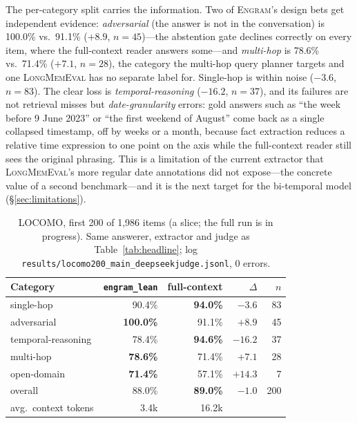 \documentclass{article}
\newcommand{\engram}{\textsc{Engram}}
\newcommand{\lean}{\texttt{engram\_lean}}
\begin{document}
The per-category split carries the information. Two of \engram{}'s design bets get independent evidence:
\emph{adversarial} (the answer is not in the conversation) is 100.0\% vs.\ 91.1\% ($+8.9$, $n=45$)---the
abstention gate declines correctly on every item, where the full-context reader answers some---and
\emph{multi-hop} is 78.6\% vs.\ 71.4\% ($+7.1$, $n=28$), the category the multi-hop query planner targets
and one \textsc{LongMemEval} has no separate label for. Single-hop is within noise ($-3.6$, $n=83$). The
clear loss is \emph{temporal-reasoning} ($-16.2$, $n=37$), and its failures are not retrieval misses but
\emph{date-granularity} errors: gold answers such as ``the week before 9 June 2023'' or ``the first weekend
of August'' come back as a single collapsed timestamp, off by weeks or a month, because fact extraction
reduces a relative time expression to one point on the axis while the full-context reader still sees the
original phrasing. This is a limitation of the current extractor that \textsc{LongMemEval}'s more regular
date annotations did not expose---the concrete value of a second benchmark---and it is the next target for
the bi-temporal model (\S\ref{sec:limitations}).

\begin{table}[h]
\centering\footnotesize
\caption{LOCOMO, first 200 of 1,986 items (a slice; the full run is in progress). Same answerer, extractor
and judge as Table~\ref{tab:headline}; log \texttt{results/locomo200\_main\_deepseekjudge.jsonl}, 0 errors.}
\label{tab:locomo}
\begin{tabular}{lrrrr}
\toprule
Category & \lean{} & full-context & $\Delta$ & $n$ \\
\midrule
single-hop         & 90.4\%           & \textbf{94.0\%} & $-3.6$  & 83 \\
adversarial        & \textbf{100.0\%} & 91.1\%          & $+8.9$  & 45 \\
temporal-reasoning & 78.4\%           & \textbf{94.6\%} & $-16.2$ & 37 \\
multi-hop          & \textbf{78.6\%}  & 71.4\%          & $+7.1$  & 28 \\
open-domain        & \textbf{71.4\%}  & 57.1\%          & $+14.3$ & 7 \\
\midrule
overall            & 88.0\%           & \textbf{89.0\%} & $-1.0$  & 200 \\
avg.\ context tokens & 3.4k           & 16.2k           &         & \\
\bottomrule
\end{tabular}
\end{table}
\end{document}
